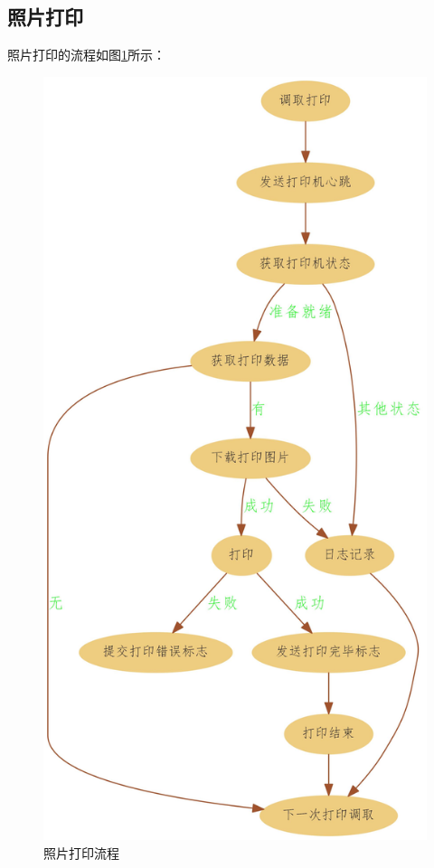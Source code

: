 \documentclass{book}
\begin{document}
\subsection{照片打印}

照片打印的流程如图\ref{PhotoPrintWorkflowOptimized}所示：

\begin{figure}[htbp]
	\centering
	\includegraphics[scale=0.2]{PhotoPrintWorkflowOptimized.jpg}
	\caption{照片打印流程}
	\label{PhotoPrintWorkflowOptimized}
\end{figure}
\end{document}
